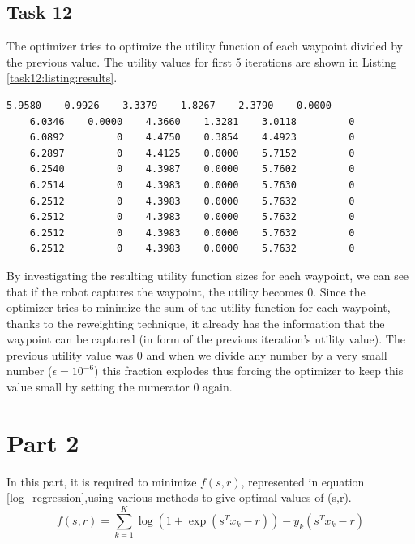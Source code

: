 \subsection {Task 12}

The optimizer tries to optimize the utility function of each waypoint divided by the previous value. The utility values for first 5 iterations are shown in Listing \ref{task12:listing:results}.

\begin{lstlisting}[label=task12:listing:results, caption=Unweighted utility function for each waypoint., float=!htb]
    5.9580    0.9926    3.3379    1.8267    2.3790    0.0000
    6.0346    0.0000    4.3660    1.3281    3.0118         0
    6.0892         0    4.4750    0.3854    4.4923         0
    6.2897         0    4.4125    0.0000    5.7152         0
    6.2540         0    4.3987    0.0000    5.7602         0
    6.2514         0    4.3983    0.0000    5.7630         0
    6.2512         0    4.3983    0.0000    5.7632         0
    6.2512         0    4.3983    0.0000    5.7632         0
    6.2512         0    4.3983    0.0000    5.7632         0
    6.2512         0    4.3983    0.0000    5.7632         0
\end{lstlisting}

By investigating the resulting utility function sizes for each waypoint, we can see that if the robot captures the waypoint, the utility becomes $0$. Since the optimizer tries to minimize the sum of the utility function for each waypoint, thanks to the reweighting technique, it already has the information that the waypoint can be captured (in form of the previous iteration's utility value). The previous utility value was $0$ and when we divide any number by a very small number ($\epsilon = 10^{-6}$) this fraction explodes thus forcing the optimizer to keep this value small by setting the numerator $0$ again. 

\section{Part 2}
In this part, it is required to minimize $f(s,r)$, represented in equation \ref{log_regression},using various methods to give optimal values of (s,r).
\begin{equation}
    \label{log_regression}
    f(s,r)=\sum_{k=1}^{K}\log(1+ \exp(s^{T}x_k - r)) - y_k(s^{T}x_k - r)
\end{equation}
